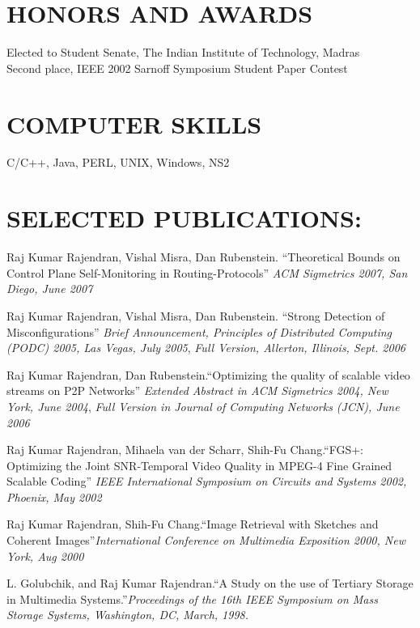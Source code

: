 \begin{resume}
\section{HONORS AND AWARDS}          
Elected to Student Senate, The Indian Institute of Technology, Madras \\
Second place, IEEE 2002 Sarnoff Symposium Student Paper Contest 

\vspace{-10pt}
\section{COMPUTER SKILLS}          
    C/C++, Java, PERL, UNIX, Windows, NS2

\section{SELECTED PUBLICATIONS:}
Raj Kumar Rajendran, Vishal Misra, Dan Rubenstein. ``Theoretical
Bounds on Control Plane Self-Monitoring in Routing-Protocols''
{\em ACM Sigmetrics 2007, San Diego, June 2007}\\
   \vspace{-12pt}

Raj Kumar Rajendran, Vishal Misra, Dan Rubenstein. ``Strong
Detection of Misconfigurations'' {\em Brief Announcement, Principles
  of Distributed Computing (PODC)  2005, Las Vegas, July 2005}, {\em
  Full Version, Allerton, Illinois, Sept. 2006}\\
   \vspace{-12pt}

Raj Kumar Rajendran, Dan Rubenstein.``Optimizing the quality of
scalable video streams on P2P Networks'' {\em Extended Abstract in
  ACM Sigmetrics 2004, New York, June 2004}, {\em Full Version in
  Journal of Computing Networks (JCN),  June 2006} \\
   \vspace{-12pt}

Raj Kumar Rajendran, Mihaela van der Scharr, Shih-Fu Chang.``FGS+:
Optimizing the Joint SNR-Temporal Video Quality in MPEG-4 Fine Grained
Scalable Coding'' {\em IEEE International Symposium on Circuits
  and Systems 2002, Phoenix, May 2002} \\
   \vspace{-12pt}

Raj Kumar Rajendran, Shih-Fu Chang.``Image Retrieval with Sketches
and Coherent Images''{\em International Conference on Multimedia
  Exposition 2000, New York, Aug 2000} \\
   \vspace{-12pt}

L. Golubchik, and Raj Kumar Rajendran.``A Study on the use of
Tertiary Storage in Multimedia Systems.''{\em Proceedings of the
  16th IEEE Symposium on Mass Storage Systems, Washington, DC,
  March, 1998.} 

 
\end{resume}

